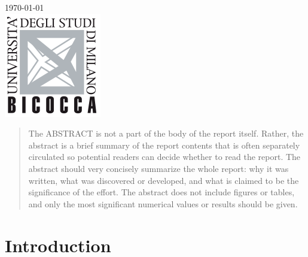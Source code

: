 \begin{titlepage}
{\large \today}\\[2cm] %


\includegraphics{figs/logo.png}\\[1cm] %
 

\vfill %

\end{titlepage}


\begin{abstract}
The ABSTRACT is not a part of the body of the report itself. Rather, the abstract is a brief summary of the report contents that is often separately circulated so potential readers can decide whether to read the report. The abstract should very concisely summarize the whole report: why it was written, what was discovered or developed, and what is claimed to be the significance of the effort. The abstract does not include figures or tables, and only the most significant numerical values or results should be given.
\end{abstract}

\section{Introduction}
